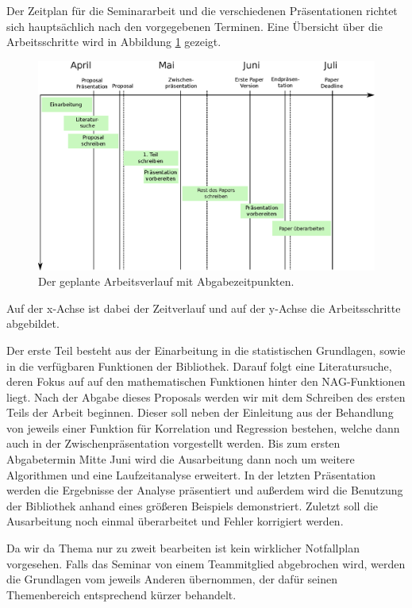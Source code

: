 \documentclass{article}
\begin{document}
Der Zeitplan für die Seminararbeit und die verschiedenen Präsentationen richtet sich hauptsächlich nach den vorgegebenen Terminen.
Eine Übersicht über die Arbeitsschritte wird in Abbildung \ref{fig:Zeitplan} gezeigt.
\begin{figure}[t]
 \includegraphics[width=\linewidth]{./figures/Workplan-adj.eps}
 \caption{Der geplante Arbeitsverlauf mit Abgabezeitpunkten.}
 \label{fig:Zeitplan}
\end{figure}
Auf der x-Achse ist dabei der Zeitverlauf und auf der y-Achse die Arbeitsschritte abgebildet.

Der erste Teil besteht aus der Einarbeitung in die statistischen Grundlagen, sowie in die verfügbaren Funktionen der Bibliothek.
Darauf folgt eine Literatursuche, deren Fokus auf auf den mathematischen Funktionen hinter den NAG-Funktionen liegt.
Nach der Abgabe dieses Proposals werden wir mit dem Schreiben des ersten Teils der Arbeit beginnen. 
Dieser soll neben der Einleitung aus der Behandlung von jeweils einer Funktion für Korrelation und Regression bestehen, welche dann auch in der Zwischenpräsentation vorgestellt werden.
Bis zum ersten Abgabetermin Mitte Juni wird die Ausarbeitung dann noch um weitere Algorithmen und eine Laufzeitanalyse erweitert.
In der letzten Präsentation werden die Ergebnisse der Analyse präsentiert und außerdem wird die Benutzung der Bibliothek anhand eines größeren Beispiels demonstriert.
Zuletzt soll die Ausarbeitung noch einmal überarbeitet und Fehler korrigiert werden.

Da wir da Thema nur zu zweit bearbeiten ist kein wirklicher Notfallplan vorgesehen. 
Falls das Seminar von einem Teammitglied abgebrochen wird, werden die Grundlagen vom jeweils Anderen übernommen, der dafür seinen Themenbereich entsprechend kürzer behandelt.


\end{document}
